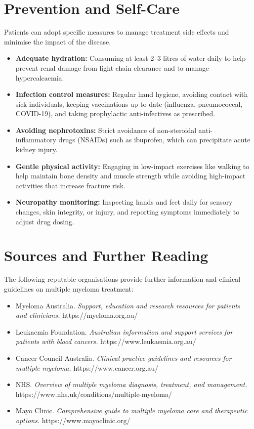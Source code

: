 \section*{Prevention and Self-Care}
Patients can adopt specific measures to manage treatment side effects and minimise the impact of the disease.
\begin{itemize}
    \item \textbf{Adequate hydration:} Consuming at least 2--3 litres of water daily to help prevent renal damage from light chain clearance and to manage hypercalcaemia.
    \item \textbf{Infection control measures:} Regular hand hygiene, avoiding contact with sick individuals, keeping vaccinations up to date (influenza, pneumococcal, COVID-19), and taking prophylactic anti-infectives as prescribed.
    \item \textbf{Avoiding nephrotoxins:} Strict avoidance of non-steroidal anti-inflammatory drugs (NSAIDs) such as ibuprofen, which can precipitate acute kidney injury.
    \item \textbf{Gentle physical activity:} Engaging in low-impact exercises like walking to help maintain bone density and muscle strength while avoiding high-impact activities that increase fracture risk.
    \item \textbf{Neuropathy monitoring:} Inspecting hands and feet daily for sensory changes, skin integrity, or injury, and reporting symptoms immediately to adjust drug dosing.
\end{itemize}

\section*{Sources and Further Reading}
The following reputable organisations provide further information and clinical guidelines on multiple myeloma treatment:
\begin{itemize}
    \item Myeloma Australia. \textit{Support, education and research resources for patients and clinicians.} https://myeloma.org.au/
    \item Leukaemia Foundation. \textit{Australian information and support services for patients with blood cancers.} https://www.leukaemia.org.au/
    \item Cancer Council Australia. \textit{Clinical practice guidelines and resources for multiple myeloma.} https://www.cancer.org.au/
    \item NHS. \textit{Overview of multiple myeloma diagnosis, treatment, and management.} https://www.nhs.uk/conditions/multiple-myeloma/
    \item Mayo Clinic. \textit{Comprehensive guide to multiple myeloma care and therapeutic options.} https://www.mayoclinic.org/
\end{itemize}
